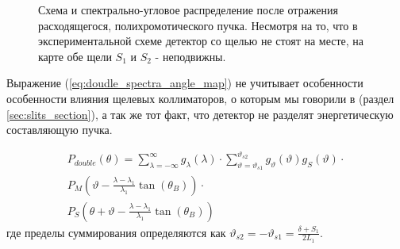 \begin{figure}[H]
  \centering
  \hfill

  \caption{Схема и спектрально-угловое распределение после отражения расходящегося, полихромотического пучка. Несмотря на то, что в
  экспериментальной схеме детектор со щелью не стоят на месте, на карте обе щели $S_1$ и $S_2$ - неподвижны. }
  \label{ris:double_crystal_schem_lamtet}
\end{figure}

Выражение (\ref{eq:doudle_spectra_angle_map}) не учитывает особенности особенности влияния щелевых коллиматоров, о которым мы говорили в
(раздел \ref{sec:slits_section}), а так же тот факт, что детектор не разделят энергетическую составляющую пучка.


\begin{eqnarray} \label{eq:doudle_spectra_angle_map_on_detector}
  P_{double}(\theta) = \sum_{\lambda = -\infty}^{\infty}g_{\lambda}(\lambda)\cdot
  \sum_{\vartheta = \vartheta_{s1}}^{\vartheta_{s2}} g_{\vartheta}(\vartheta) g_{S}(\vartheta) \cdot \nonumber \\
   P_M \left(\vartheta - \frac{\lambda - \lambda_1}{\lambda_1}\tan(\theta_B) \right) \cdot \nonumber \\
   P_S \left(\theta + \vartheta - \frac{\lambda - \lambda_1}{\lambda_1}\tan(\theta_B)\right)
 \end{eqnarray}
 где пределы суммирования определяются как $\vartheta_{s2} = - \vartheta_{s1} = \frac{\delta+S_1}{2L_1}$.

